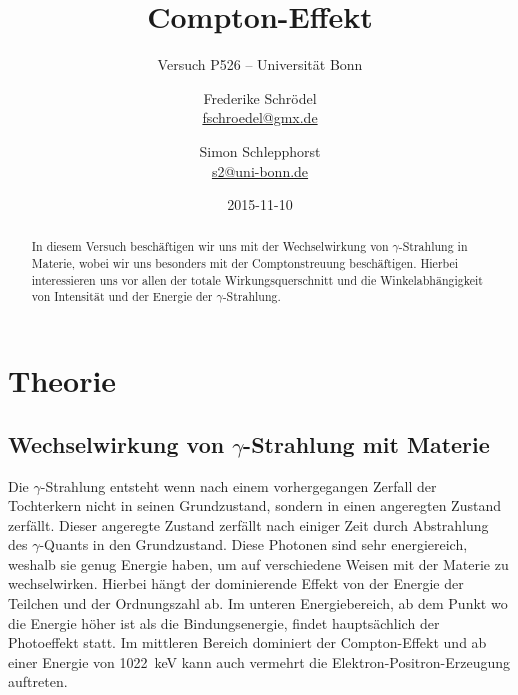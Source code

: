 \documentclass[11pt, ngerman, fleqn, DIV=15, headinclude, BCOR=2cm]{scrreprt}
\title{Compton-Effekt}
\subtitle{Versuch P526 -- Universität Bonn}
\author{
	Frederike Schrödel \\
	\small{\href{mailto:fschroedel@gmx.de}{fschroedel@gmx.de}}
	\and
	Simon Schlepphorst \\
	\small{\href{mailto:s2@uni-bonn.de}{s2@uni-bonn.de}}
}
\date{2015-11-10}
\begin{document}
\maketitle

\begin{abstract}
    In diesem Versuch beschäftigen wir uns mit der Wechselwirkung von
    $\gamma$-Strahlung in Materie, wobei wir uns besonders mit der
    Comptonstreuung beschäftigen.  Hierbei interessieren uns vor allen der
    totale Wirkungsquerschnitt und die Winkelabhängigkeit von Intensität und
    der Energie der $\gamma$-Strahlung.
\end{abstract}

\tableofcontents

\chapter{Theorie}


\section{Wechselwirkung von $\gamma$-Strahlung mit Materie}
\label{sec:WW-strahlung-Materie}

Die $\gamma$-Strahlung entsteht wenn nach einem vorhergegangen Zerfall der
Tochterkern nicht in seinen Grundzustand, sondern in einen angeregten Zustand
zerfällt.
Dieser angeregte Zustand zerfällt nach einiger Zeit durch Abstrahlung des
$\gamma$-Quants in den Grundzustand. Diese Photonen sind sehr energiereich,
weshalb sie genug Energie haben, um auf verschiedene Weisen mit der Materie zu
wechselwirken. Hierbei hängt der dominierende Effekt von der
Energie der Teilchen und der Ordnungszahl ab.
Im unteren Energiebereich, ab dem Punkt wo die Energie höher ist als die
Bindungsenergie, findet hauptsächlich der Photoeffekt statt. Im mittleren
Bereich dominiert der Compton-Effekt und ab einer Energie von
\SI{1022}{\kilo\electronvolt} kann auch vermehrt die
Elektron-Positron-Erzeugung auftreten.
\end{document}
